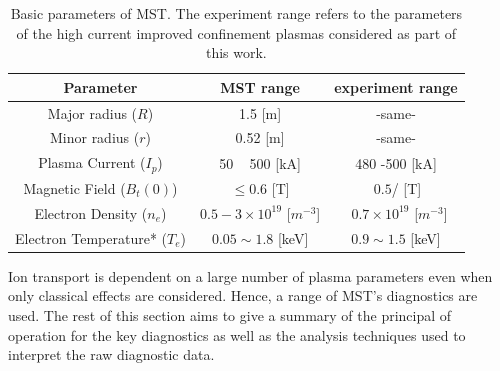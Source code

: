 \begin{table}[]
    \centering
    \begin{tabular}{||c|c|c||}
        Parameter & MST range & experiment range\\
        \hline
        Major radius ($R$)& 1.5 [m] & -same- \\
        Minor radius ($r$)& 0.52 [m] & -same- \\
        Plasma Current ($I_p$) & 50 ~ 500 [kA] & 480 -500 [kA] \\
        Magnetic Field ($B_t(0)$) & $\leq 0.6$ [T] & $~0.5$/ [T] \\
        Electron Density ($n_e$) & $0.5 - 3 \times 10^{19}$ [$m^{-3}$] & ~$0.7 \times 10^{19}$ [$m^{-3}$]\\
        Electron Temperature* ($T_e$) & $0.05 \sim 1.8$ [keV] & $0.9 \sim 1.5$ [keV] \\
        
    \end{tabular}
    \caption[MST parameters]{Basic parameters of MST. The experiment range refers to the parameters of the high current improved confinement plasmas considered as part of this work. }
    \label{tab:my_label}
\end{table}



Ion transport is dependent on a large number of plasma parameters even when only classical effects are considered. Hence, a range of MST's diagnostics are used. The rest of this section aims to give a summary of the principal of operation for the key diagnostics as well as the analysis techniques used to interpret %
the raw diagnostic data. 









